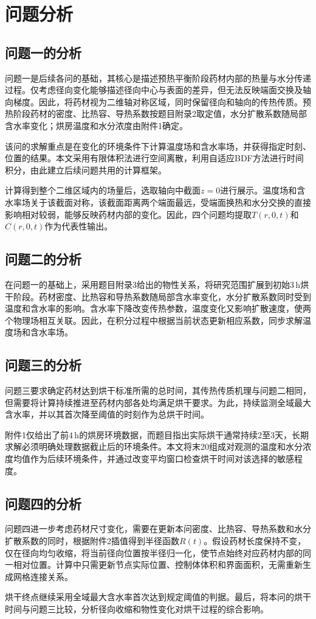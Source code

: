 \section{问题分析}
\subsection{问题一的分析}
问题一是后续各问的基础，其核心是描述预热平衡阶段药材内部的热量与水分传递过程。仅考虑径向变化能够描述径向中心与表面的差异，但无法反映端面交换及轴向梯度。因此，将药材视为二维轴对称区域，同时保留径向和轴向的传热传质。预热阶段药材的密度、比热容、导热系数按题目附录2取定值，水分扩散系数随局部含水率变化；烘房温度和水分浓度由附件1确定。

该问的求解重点是在变化的环境条件下计算温度场和含水率场，并获得指定时刻、位置的结果。本文采用有限体积法进行空间离散，利用自适应BDF方法进行时间积分，由此建立后续问题共用的计算框架。

计算得到整个二维区域内的场量后，选取轴向中截面$z=0$进行展示。温度场和含水率场关于该截面对称，该截面距离两个端面最远，受端面换热和水分交换的直接影响相对较弱，能够反映药材内部的变化。因此，四个问题均提取$T(r,0,t)$和$C(r,0,t)$作为代表性输出。

\subsection{问题二的分析}
在问题一的基础上，采用题目附录3给出的物性关系，将研究范围扩展到初始$3\,\mathrm{h}$烘干阶段。药材密度、比热容和导热系数随局部含水率变化，水分扩散系数同时受到温度和含水率的影响。含水率下降改变传热参数，温度变化又影响扩散速度，使两个物理场相互关联。因此，在积分过程中根据当前状态更新相应系数，同步求解温度场和含水率场。

\subsection{问题三的分析}
问题三要求确定药材达到烘干标准所需的总时间，其传热传质机理与问题二相同，但需要将计算持续推进至药材内部各处均满足烘干要求。为此，持续监测全域最大含水率，并以其首次降至阈值的时刻作为总烘干时间。

附件1仅给出了前$4\,\mathrm{h}$的烘房环境数据，而题目指出实际烘干通常持续2至3天，长期求解必须明确处理数据截止后的环境条件。本文将末20组成对观测的温度和水分浓度均值作为后续环境条件，并通过改变平均窗口检查烘干时间对该选择的敏感程度。

\subsection{问题四的分析}
问题四进一步考虑药材尺寸变化，需要在更新本问密度、比热容、导热系数和水分扩散系数的同时，根据附件2插值得到半径函数$R(t)$。假设药材长度保持不变，仅在径向均匀收缩，将当前径向位置按半径归一化，使节点始终对应药材内部的同一相对位置。计算中只需更新节点实际位置、控制体体积和界面面积，无需重新生成网格连接关系。

烘干终点继续采用全域最大含水率首次达到规定阈值的判据。最后，将本问的烘干时间与问题三比较，分析径向收缩和物性变化对烘干过程的综合影响。
